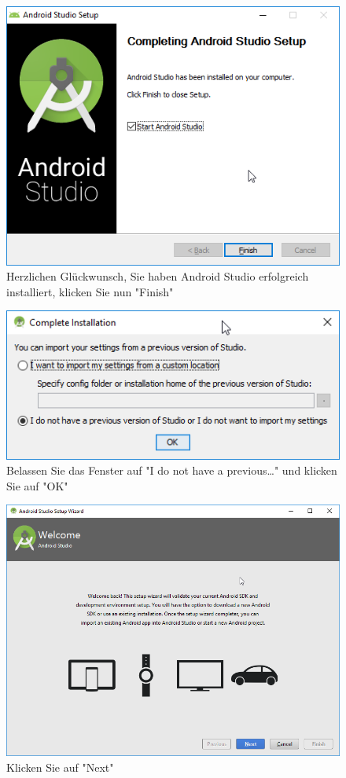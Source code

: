 \documentclass[a4paper,10pt,xetex]{article}
\begin{document}
\begin{figure}
  \centering
  \includegraphics[width=\textwidth]{Installation/1-8}
  \caption{Herzlichen Glückwunsch, Sie haben Android Studio erfolgreich installiert, klicken Sie nun "Finish" }
\end{figure}

\begin{figure}
  \centering
  \includegraphics[width=\textwidth]{Installation/1-9}
  \caption{Belassen Sie das Fenster auf "I do not have a previous\ldots" und klicken Sie auf "OK"}
\end{figure}

\begin{figure}
  \centering
  \includegraphics[width=\textwidth]{Installation/1-10}
  \caption{Klicken Sie auf "Next"}
\end{figure}
\end{document}
